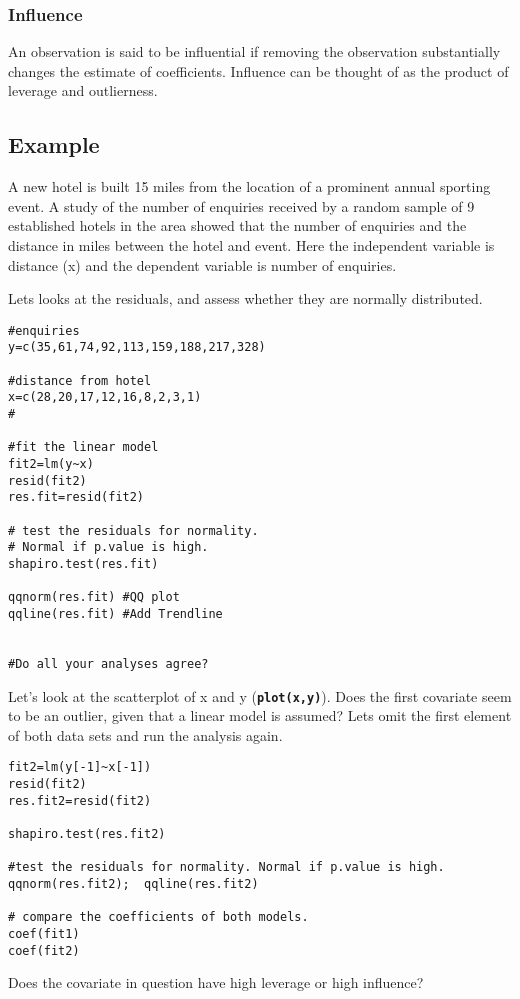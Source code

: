 \documentclass[a4paper,12pt]{article}
\begin{document}
\subsubsection{Influence} An observation is said to be influential if removing the observation substantially changes the estimate of coefficients.  Influence can be thought of as the product of leverage and outlierness.
\subsection{Example}
A new hotel is built 15 miles from the location of a prominent annual sporting event. A study of the number of enquiries received by a random sample of 9 established hotels in the area showed that the number of enquiries and the distance in miles between the hotel and event. Here the independent variable is distance (x) and the dependent variable is number of enquiries.

Lets looks at the residuals, and assess whether they are normally distributed.

\begin{framed}
\begin{verbatim}
#enquiries
y=c(35,61,74,92,113,159,188,217,328)
 	
#distance from hotel
x=c(28,20,17,12,16,8,2,3,1)	
#

#fit the linear model	
fit2=lm(y~x)					
resid(fit2)
res.fit=resid(fit2)

# test the residuals for normality.
# Normal if p.value is high.
shapiro.test(res.fit)	
	
qqnorm(res.fit)	#QQ plot
qqline(res.fit)	#Add Trendline


#Do all your analyses agree?

\end{verbatim}
\end{framed}
Let’s look at the scatterplot of x and y (\textbf{\texttt{plot(x,y)}}).  Does the first covariate seem to be an outlier, given that a linear model is assumed?
Lets omit the first element of both data sets and run the analysis again.

\begin{framed}
\begin{verbatim}
fit2=lm(y[-1]~x[-1])
resid(fit2)
res.fit2=resid(fit2)

shapiro.test(res.fit2)			

#test the residuals for normality. Normal if p.value is high.
qqnorm(res.fit2);  qqline(res.fit2)			

# compare the coefficients of both models.
coef(fit1)
coef(fit2)

\end{verbatim}
\end{framed}
Does the covariate in question have high leverage or high influence?
\end{document}
